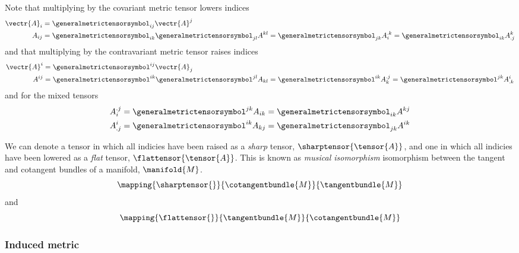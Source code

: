 Note that multiplying by the covariant metric tensor lowers indices \ie
\begin{equation}
  \begin{split}
    \vectr{A}_{i} &= \generalmetrictensorsymbol_{ij}\vectr{A}^{j} \\
    A_{ij} &= \generalmetrictensorsymbol_{ik}\generalmetrictensorsymbol_{jl}A^{kl} = \generalmetrictensorsymbol_{jk}A_{i}^{.k} = \generalmetrictensorsymbol_{ik}A^{k}_{.j} 
  \end{split}
\end{equation}
and that multiplying by the contravariant metric tensor raises indices \ie
\begin{equation}
  \begin{split}
  \vectr{A}^{i} &=  \generalmetrictensorsymbol^{ij}\vectr{A}_{j} \\
   A^{ij} &= \generalmetrictensorsymbol^{ik}\generalmetrictensorsymbol^{jl}A_{kl} = \generalmetrictensorsymbol^{ik}A_{k}^{.j} = \generalmetrictensorsymbol^{jk}A^{i}_{.k}
  \end{split}
\end{equation}
and for the mixed tensors
\begin{equation}
  \begin{split}
  A_{i}^{.j} &= \generalmetrictensorsymbol^{jk}A_{ik} = \generalmetrictensorsymbol_{ik}A^{kj} \\
  A^{i}_{.j} &= \generalmetrictensorsymbol^{ik}A_{kj} = \generalmetrictensorsymbol_{jk}A^{ik} \\
  \end{split}
\end{equation}

We can denote a tensor in which all indicies have been raised as a
\emph{sharp} tensor, $\sharptensor{\tensor{A}}$, and one in which all indicies have been lowered as a
\emph{flat} tensor, $\flattensor{\tensor{A}}$. This is known as \emph{musical isomorphism} \ie
isomorphism between the tangent and cotangent bundles of a manifold, $\manifold{M}$.
\begin{equation}
  \mapping{\sharptensor{}}{\cotangentbundle{M}}{\tangentbundle{M}}
\end{equation}
and
\begin{equation}
  \mapping{\flattensor{}}{\tangentbundle{M}}{\cotangentbundle{M}}
\end{equation}

\subsubsection{Induced metric}

